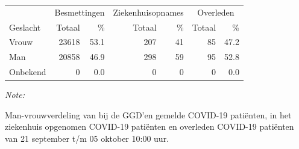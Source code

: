 \documentclass[
  english,
  man,floatsintext]{apa6}
\begin{document}
\begin{table}[H]
\centering\begingroup\fontsize{11}{13}\selectfont

\begin{threeparttable}
\begin{tabular}{lrrrrrr}
\toprule
\multicolumn{1}{c}{ } & \multicolumn{2}{c}{Besmettingen} & \multicolumn{2}{c}{Ziekenhuisopnames} & \multicolumn{2}{c}{Overleden} \\
\cmidrule(l{3pt}r{3pt}){2-3} \cmidrule(l{3pt}r{3pt}){4-5} \cmidrule(l{3pt}r{3pt}){6-7}
Geslacht & Totaal & \% & Totaal & \% & Totaal & \%\\
\midrule
Vrouw & 23618 & 53.1 & 207 & 41 & 85 & 47.2\\
Man & 20858 & 46.9 & 298 & 59 & 95 & 52.8\\
Onbekend & 0 & 0.0 & 0 & 0 & 0 & 0.0\\
\bottomrule
\end{tabular}
\begin{tablenotes}
\item \textit{Note: } 
\item Man-vrouwverdeling van bij de GGD’en gemelde COVID-19 patiënten, in het ziekenhuis opgenomen COVID-19 patiënten en overleden COVID-19 patiënten van 21 september t/m 05 oktober 10:00 uur.
\end{tablenotes}
\end{threeparttable}
\endgroup{}
\end{table}
\newpage
\end{document}
